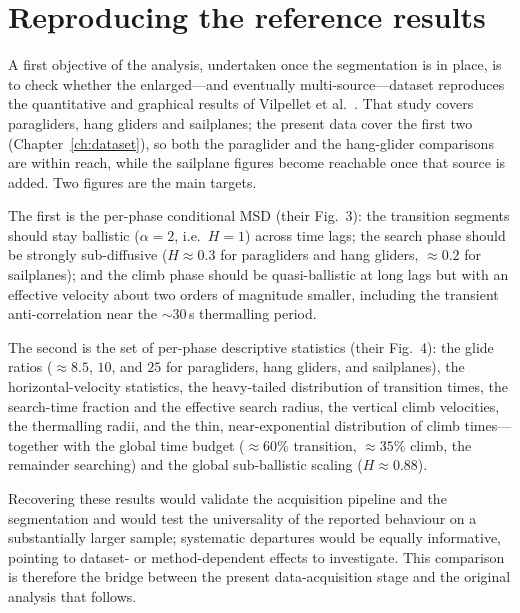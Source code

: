 \section{Reproducing the reference results}
\label{sec:reproducing}
A first objective of the analysis, undertaken once the segmentation is in place, is to check
whether the enlarged---and eventually multi-source---dataset reproduces the quantitative and
graphical results of Vilpellet et al.~\cite{vilpellet2026}. That study covers paragliders,
hang gliders and sailplanes; the present data cover the first two (Chapter~\ref{ch:dataset}),
so both the paraglider and the hang-glider comparisons are within reach, while the sailplane
figures become reachable once that source is added. Two figures are the main targets.

The first is the per-phase conditional MSD (their Fig.~3): the transition segments should
stay ballistic ($\alpha=2$, i.e.\ $H=1$) across time lags; the search phase should be
strongly sub-diffusive ($H\approx0.3$ for paragliders and hang gliders, $\approx0.2$ for
sailplanes); and the climb phase should be quasi-ballistic at long lags but with an effective
velocity about two orders of magnitude smaller, including the transient anti-correlation near
the $\sim\!30$\,s thermalling period.

The second is the set of per-phase descriptive statistics (their Fig.~4): the glide ratios
($\approx 8.5$, $10$, and $25$ for paragliders, hang gliders, and sailplanes), the
horizontal-velocity statistics, the heavy-tailed distribution of transition times, the
search-time fraction and the effective search radius, the vertical climb velocities, the
thermalling radii, and the thin, near-exponential distribution of climb times---together with
the global time budget ($\approx\!60\%$ transition, $\approx\!35\%$ climb, the remainder
searching) and the global sub-ballistic scaling ($H\approx0.88$).

Recovering these results would validate the acquisition pipeline and the segmentation and
would test the universality of the reported behaviour on a substantially larger sample;
systematic departures would be equally informative, pointing to dataset- or method-dependent
effects to investigate. This comparison is therefore the bridge between the present
data-acquisition stage and the original analysis that follows.

